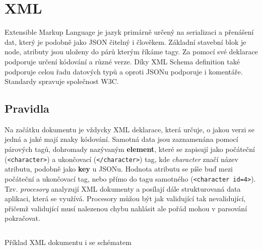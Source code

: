 \section{XML}
Extensible Markup Language je jazyk primárně určený na serializaci a přenášení dat, který je podobně jako JSON čitelný i člověkem. Základní stavební blok je node, atributy jsou uloženy do párů kterým říkáme tagy. Za pomocí své deklarace podporuje určení kódování a různé verze. Díky XML Schema definition také podporuje celou řadu datových typů a oproti JSONu podporuje i komentáře. Standardy spravuje společnost W3C. %


\subsection{Pravidla}
Na začátku dokumentu je vždycky XML deklarace, která určuje, o jakou verzi se jedná a jaké mají znaky kódování.
Samotná data jsou zaznamenána pomocí párových tagů, dohromady nazývaným \textbf{element}, které se zapisují jako počáteční (\texttt{<character>}) a ukončovací (\texttt{</character>}) tag, kde \textit{character} značí název atributu, podobně jako \textbf{key} u JSONu. Hodnota atributu se píše buď mezi počáteční a ukončovací tag, nebo přímo do tagu samotného (\texttt{<character id=4>}). Tzv. \textit{procesory} analyzují XML dokumenty a posílají dále strukturovaná data aplikaci, která se využívá. Procesory můžou být jak validující tak nevalidující, přičemž validující musí nalezenou chybu nahlásit ale pořád mohou v parsování pokračovat.

\begin{listing}[H]
  \inputminted{xml}{resources/code/standards/player.xml}
  \caption{Příklad XML dokumentu i se schématem}
  \label{code:xml_player}
\end{listing}

